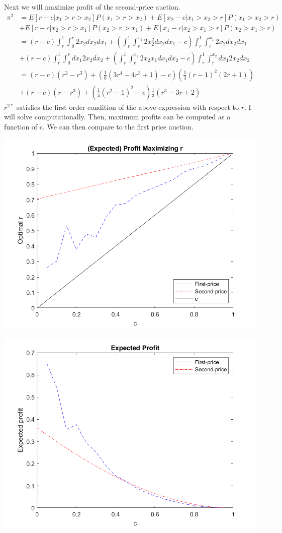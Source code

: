 \documentclass[11pt]{article} %
\begin{document}
Next we will maximize profit of the second-price auction. 
\begin{align*}
\pi^2 &=  E[r - c| x_1>r>x_2]P(x_1>r>x_2) + E[x_2 - c| x_1>x_2>r]P(x_1>x_2>r) \\&+ E[r - c|x_2>r>x_1 ]P(x_2>r>x_1) + E[x_1 - c|x_2>x_1>r ]P(x_2>x_1>r) \\
&= (r - c)\int_{r}^1\int_{0}^r 2x_2 dx_2dx_1+ \left( \int_{r}^1 \int_r^{x_1}2x_2^2 dx_2 dx_1 - c \right) \int_{r}^1\int_{r}^{x_1} 2x_2 dx_2dx_1 \\&+ (r - c)\int_{r}^1\int_{0}^r  dx_1 2x_2 dx_2 + \left( \int_{r}^1 \int_r^{x_2}2x_2x_1 dx_1 dx_2 - c \right)\int_{r}^1\int_{r}^{x_2}  dx_1 2x_2 dx_2 \\
&= (r-c)(r^2-r^3) + \left(\frac{1}{6}(3r^4 - 4r^3 + 1) - c \right) \left( \frac{1}{3}(r-1)^2(2r+1) \right) \\ &+ (r-c)(r-r^3) + \left(\frac{1}{4}(r^2-1)^2 - c\right)
\frac{1}{3}(r^3 - 3r + 2)\end{align*}
$r^{2*}$ satisfies the first order condition of the above expression with respect to $r$. I will solve computationally. Then, maximum profits can be computed as a function of c. We can then compare to the first price auction.

\includegraphics{argmax}

\includegraphics{profit}
\end{document}
